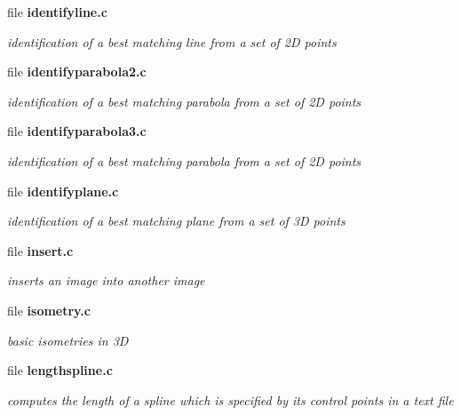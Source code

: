 \begin{CompactItemize}
\item 
file \bf{identifyline.c}
\begin{CompactList}\small\item\em identification of a best matching line from a set of 2D points \item\end{CompactList}

\item 
file \bf{identifyparabola2.c}
\begin{CompactList}\small\item\em identification of a best matching parabola from a set of 2D points \item\end{CompactList}

\item 
file \bf{identifyparabola3.c}
\begin{CompactList}\small\item\em identification of a best matching parabola from a set of 2D points \item\end{CompactList}

\item 
file \bf{identifyplane.c}
\begin{CompactList}\small\item\em identification of a best matching plane from a set of 3D points \item\end{CompactList}

\item 
file \bf{insert.c}
\begin{CompactList}\small\item\em inserts an image into another image \item\end{CompactList}

\item 
file \bf{isometry.c}
\begin{CompactList}\small\item\em basic isometries in 3D \item\end{CompactList}

\item 
file \bf{lengthspline.c}
\begin{CompactList}\small\item\em computes the length of a spline which is specified by its control points in a text file \item\end{CompactList}


\end{CompactItemize}
